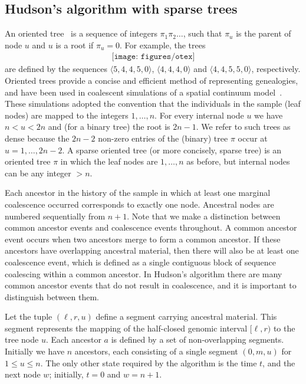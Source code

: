 \documentclass[10pt]{article}
\begin{document}
\subsection{Hudson's algorithm with sparse trees}
\label{sec-simulation-algorithm}

An oriented tree~\cite[p.\ 461]{k11} is a sequence  of integers
$\pi_1\pi_2\dots$, such that $\pi_u$ is the parent of node
$u$ and $u$ is a root if $\pi_u = 0$. For example, the trees
\begin{equation*}\label{eqn-otex}
\begin{array}{c}
\texttt{[image: figures/otex]}
\end{array}
\end{equation*}
are defined by the sequences $\langle 5,4,4,5,0\rangle$,
$\langle 4,4,4,0\rangle$ and $\langle 4,4,5,5,0\rangle$, respectively.
Oriented trees provide a concise and efficient method of representing
genealogies, and have been used in coalescent simulations of a spatial
continuum model~\citep{kbe13,keb14}. These simulations adopted the convention
that the individuals in the sample (leaf nodes) are mapped to the integers $1,
\dots, n$. For every internal node $u$ we have $n < u < 2n$ and (for a binary
tree) the root is $2n - 1$. We refer to such trees as dense because the $2n -
2$ non-zero entries of the (binary) tree $\pi$ occur at $u = 1, \dots, 2n - 2$. A
sparse oriented tree (or more concisely, sparse tree) is an oriented tree $\pi$
in which the leaf nodes are $1, \dots, n$ as before, but internal nodes can be
any integer $> n$.

Each ancestor in the history of the sample in which at least one marginal
coalescence occurred corresponds to exactly one node. Ancestral nodes are
numbered sequentially from $n + 1$. Note that we make a distinction between
common ancestor events and coalescence events throughout. A common ancestor
event occurs when two ancestors merge to form a common ancestor. If these
ancestors have overlapping ancestral material, then there will also be at least
one coalescence event, which is defined as a single contiguous block of sequence
coalescing within a common ancestor. In Hudson's algorithm there are many common
ancestor events that do not result in coalescence, and it is important to
distinguish between them.

Let the tuple $(\ell, r, u)$ define a segment carrying ancestral material.
This segment represents the mapping of the half-closed genomic interval $[\ell,
r)$ to the tree node $u$. Each ancestor $a$ is defined by a set of
non-overlapping segments. Initially we have $n$ ancestors, each consisting of a
single segment $(0, m, u)$ for $1 \leq u \leq n$. The only other state required
by the algorithm is the time $t$, and the next node $w$; initially, $t =
0$ and $w = n + 1$.
\end{document}
